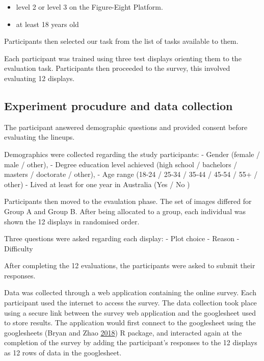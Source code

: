 \documentclass[conference,final,]{IEEEtran}
\providecommand{\tightlist}{%
  \setlength{\itemsep}{0pt}\setlength{\parskip}{0pt}}
\begin{document}
\begin{itemize}
\tightlist
\item
  level 2 or level 3 on the Figure-Eight Platform.
\item
  at least 18 years old
\end{itemize}

Participants then selected our task from the list of tasks available to
them.

Each participant was trained using three test displays orienting them to
the evaluation task. Participants then proceeded to the survey, this
involved evaluating 12 displays.

\hypertarget{experiment-procudure-and-data-collection}{%
\subsection{Experiment procudure and data
collection}\label{experiment-procudure-and-data-collection}}

The participant answered demographic questions and provided consent
before evaluating the lineups.

Demographics were collected regarding the study participants: - Gender
(female / male / other), - Degree education level achieved (high school
/ bachelors / masters / doctorate / other), - Age range (18-24 / 25-34 /
35-44 / 45-54 / 55+ / other) - Lived at least for one year in Australia
(Yes / No )

Participants then moved to the evaulation phase. The set of images
differed for Group A and Group B. After being allocated to a group, each
individual was shown the 12 displays in randomised order.

Three questions were asked regarding each display: - Plot choice -
Reason - Difficulty

After completing the 12 evaluations, the participants were asked to
submit their responses.

Data was collected through a web application containing the online
survey. Each participant used the internet to access the survey. The
data collection took place using a secure link between the survey web
application and the googlesheet used to store results. The application
would first connect to the googlesheet using the googlesheets (Bryan and
Zhao \protect\hyperlink{ref-sheets}{2018}) R package, and interacted
again at the completion of the survey by adding the participant's
responses to the 12 displays as 12 rows of data in the googlesheet.
\end{document}
